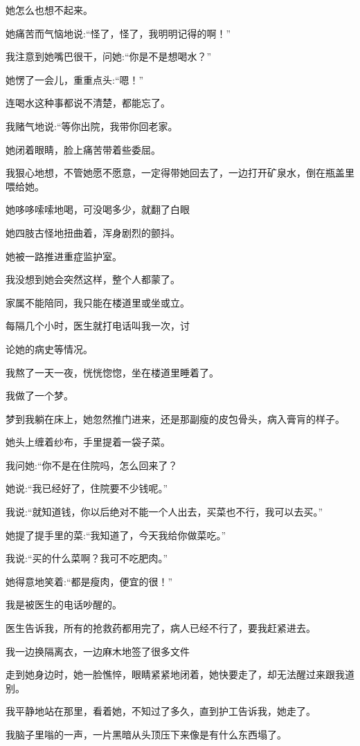 \documentclass{article}
\begin{document}
她怎么也想不起来。

她痛苦而气恼地说:“怪了，怪了，我明明记得的啊！”

我注意到她嘴巴很干，问她:“你是不是想喝水？”

她愣了一会儿，重重点头:“嗯！”

连喝水这种事都说不清楚，都能忘了。

我赌气地说:“等你出院，我带你回老家。

她闭着眼睛，脸上痛苦带着些委屈。

我狠心地想，不管她愿不愿意，一定得带她回去了，一边打开矿泉水，倒在瓶盖里喂给她。

她哆哆嗦嗦地喝，可没喝多少，就翻了白眼

她四肢古怪地扭曲着，浑身剧烈的颤抖。

她被一路推进重症监护室。

我没想到她会突然这样，整个人都蒙了。

家属不能陪同，我只能在楼道里或坐或立。

每隔几个小时，医生就打电话叫我一次，讨

\newpage 

论她的病史等情况。

我熬了一天一夜，恍恍惚惚，坐在楼道里睡着了。

我做了一个梦。

梦到我躺在床上，她忽然推门进来，还是那副瘦的皮包骨头，病入膏肓的样子。

她头上缠着纱布，手里提着一袋子菜。

我问她:“你不是在住院吗，怎么回来了？

她说:“我已经好了，住院要不少钱呢。”

我说:“就知道钱，你以后绝对不能一个人出去，买菜也不行，我可以去买。”

她提了提手里的菜:“我知道了，今天我给你做菜吃。”

我说:“买的什么菜啊？我可不吃肥肉。”

她得意地笑着:“都是瘦肉，便宜的很！”

我是被医生的电话吵醒的。

医生告诉我，所有的抢救药都用完了，病人已经不行了，要我赶紧进去。

我一边换隔离衣，一边麻木地签了很多文件

走到她身边时，她一脸憔悴，眼睛紧紧地闭着，她快要走了，却无法醒过来跟我道别。

\newpage 



我平静地站在那里，看着她，不知过了多久，直到护工告诉我，她走了。

我脑子里嗡的一声，一片黑暗从头顶压下来像是有什么东西塌了。
\end{document}
